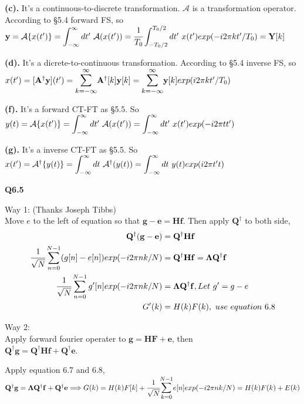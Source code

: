 \documentclass[12pt,a4paper]{article}
\begin{document}
    \textbf{(c).}
    It's a continuous-to-discrete transformation. $\mathcal{A}$ is a transformation operator. 
    According to \S5.4 forward FS, so\\
    $\mathbf{y}=\mathcal{A}\{x(t')\}=\infint dt'\ \mathcal{A}(x(t'))=\cfrac{1}{T_0}\bint{-T_0/2}{T_0/2}dt'\ x(t')exp(-i2\pi kt'/T_0)=\mathbf{Y}[k]$

    \textbf{(d).}
    It's a dicrete-to-continuous transformation.
    According to \S5.4 inverse FS, so\\
    $x(t')=[\mathbf{A^\dagger y}](t')=\bsum{k=-\infty}{\infty}\mathbf{A^\dagger}[k]\mathbf{y}[k]=\bsum{k=-\infty}{\infty}\mathbf{y}[k]exp(i2\pi kt'/T_0)$

    \textbf{(f).}
    It's a forward CT-FT as \S5.5. So\\
    $y(t)=\mathcal{A}\{x(t')\}=\infint dt'\ \mathcal{A}(x(t'))=\infint dt'\ x(t')exp(-i2\pi tt')$
    
    \textbf{(g).}
    It's a inverse CT-FT as \S5.5. So\\
    $x(t')=\mathcal{A}^\dagger \{y(t)\}=\infint dt\ \mathcal{A^\dagger}(y(t))=\infint dt\ y(t) exp(i2\pi t't)$

    \newpage
    \Large{\textbf{Q6.5}}

    Way 1: (Thanks Joseph Tibbs)\\
    Move $e$ to the left of equation so that $\mathbf{g-e=Hf}$. Then apply $\mathbf{Q^\dagger}$ to both side,\\
    \begin{equation*}
    \begin{split}
    \mathbf{Q^\dagger(g-e)} & =\mathbf{Q^\dagger Hf}\\
    \cfrac{1}{\sqrt{N}}\sum_{n=0}^{N-1}(g[n]-e[n])exp(-i2\pi nk/N) &=\mathbf{Q^\dagger Hf}=\mathbf{\Lambda Q^\dagger f} \\
    \cfrac{1}{\sqrt{N}}\sum_{n=0}^{N-1}g'[n]exp(-i2\pi nk/N) &=\mathbf{\Lambda Q^\dagger f}, Let\ g'=g-e \\ 
    G'(k) &= H(k)F(k), \ use\ equation\ 6.8
    \end{split}
    \end{equation*}

    \hrulefill

    Way 2:\\
    Apply forward fourier operater to $\mathbf{g=HF+e}$, then\\
    $\mathbf{Q^\dagger g =Q^\dagger Hf +Q^\dagger e}$.

    \noindent Apply equation 6.7 and 6.8, \\
    $\mathbf{Q^\dagger g=\Lambda Q^\dagger f +Q^\dagger e}\\
    \Longrightarrow G(k)=H(k)F[k]+\cfrac{1}{\sqrt{N}}\bsum{k=0}{N-1}e[n]exp(-i2\pi nk/N)\\
    =H(k)F(k)+E(k)$
\end{document}
